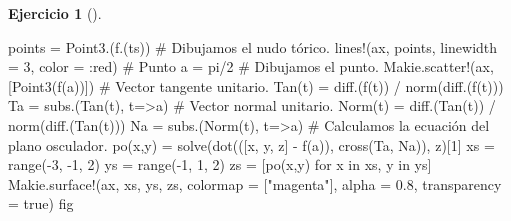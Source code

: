 \documentclass[
  a4paper,
]{scrreport}
\newenvironment{Shaded}{\begin{snugshade}}{\end{snugshade}}
\newcommand{\CommentTok}[1]{\textcolor[rgb]{0.37,0.37,0.37}{#1}}
\newcommand{\ConstantTok}[1]{\textcolor[rgb]{0.56,0.35,0.01}{#1}}
\newcommand{\FloatTok}[1]{\textcolor[rgb]{0.68,0.00,0.00}{#1}}
\newcommand{\FunctionTok}[1]{\textcolor[rgb]{0.28,0.35,0.67}{#1}}
\newcommand{\KeywordTok}[1]{\textcolor[rgb]{0.00,0.23,0.31}{#1}}
\newcommand{\NormalTok}[1]{\textcolor[rgb]{0.00,0.23,0.31}{#1}}
\newcommand{\OperatorTok}[1]{\textcolor[rgb]{0.37,0.37,0.37}{#1}}
\newcommand{\StringTok}[1]{\textcolor[rgb]{0.13,0.47,0.30}{#1}}
\theoremstyle{definition}
\newtheorem{exercise}{Ejercicio}[chapter]
\theoremstyle{remark}
\begin{document}
\begin{exercise}[]
\begin{tcolorbox}
\begin{Shaded}
\begin{Highlighting}[]
\NormalTok{points }\OperatorTok{=} \FunctionTok{Point3}\NormalTok{.(}\FunctionTok{f}\NormalTok{.(ts))}
\CommentTok{\# Dibujamos el nudo tórico.}
\FunctionTok{lines!}\NormalTok{(ax, points, linewidth }\OperatorTok{=} \FloatTok{3}\NormalTok{, color }\OperatorTok{=} \OperatorTok{:}\NormalTok{red)}
\CommentTok{\# Punto}
\NormalTok{a }\OperatorTok{=} \ConstantTok{pi}\OperatorTok{/}\FloatTok{2}
\CommentTok{\# Dibujamos el punto.}
\NormalTok{Makie.}\FunctionTok{scatter!}\NormalTok{(ax, [}\FunctionTok{Point3}\NormalTok{(}\FunctionTok{f}\NormalTok{(a))])}
\CommentTok{\# Vector tangente unitario.}
\FunctionTok{Tan}\NormalTok{(t) }\OperatorTok{=} \FunctionTok{diff}\NormalTok{.(}\FunctionTok{f}\NormalTok{(t)) }\OperatorTok{/} \FunctionTok{norm}\NormalTok{(}\FunctionTok{diff}\NormalTok{.(}\FunctionTok{f}\NormalTok{(t)))}
\NormalTok{Ta }\OperatorTok{=} \FunctionTok{subs}\NormalTok{.(}\FunctionTok{Tan}\NormalTok{(t), t}\OperatorTok{=\textgreater{}}\NormalTok{a)}
\CommentTok{\# Vector normal unitario.}
\FunctionTok{Norm}\NormalTok{(t) }\OperatorTok{=} \FunctionTok{diff}\NormalTok{.(}\FunctionTok{Tan}\NormalTok{(t)) }\OperatorTok{/} \FunctionTok{norm}\NormalTok{(}\FunctionTok{diff}\NormalTok{.(}\FunctionTok{Tan}\NormalTok{(t)))}
\NormalTok{Na }\OperatorTok{=} \FunctionTok{subs}\NormalTok{.(}\FunctionTok{Norm}\NormalTok{(t), t}\OperatorTok{=\textgreater{}}\NormalTok{a)}
\CommentTok{\# Calculamos la ecuación del plano osculador.}
\FunctionTok{po}\NormalTok{(x,y) }\OperatorTok{=} \FunctionTok{solve}\NormalTok{(}\FunctionTok{dot}\NormalTok{(([x, y, z] }\OperatorTok{{-}} \FunctionTok{f}\NormalTok{(a)), }\FunctionTok{cross}\NormalTok{(Ta, Na)), z)[}\FloatTok{1}\NormalTok{]}
\NormalTok{xs }\OperatorTok{=} \FunctionTok{range}\NormalTok{(}\OperatorTok{{-}}\FloatTok{3}\NormalTok{, }\OperatorTok{{-}}\FloatTok{1}\NormalTok{, }\FloatTok{2}\NormalTok{)}
\NormalTok{ys }\OperatorTok{=} \FunctionTok{range}\NormalTok{(}\OperatorTok{{-}}\FloatTok{1}\NormalTok{, }\FloatTok{1}\NormalTok{, }\FloatTok{2}\NormalTok{)}
\NormalTok{zs }\OperatorTok{=}\NormalTok{ [}\FunctionTok{po}\NormalTok{(x,y) for x }\KeywordTok{in}\NormalTok{ xs, y }\KeywordTok{in}\NormalTok{ ys]}
\NormalTok{Makie.}\FunctionTok{surface!}\NormalTok{(ax, xs, ys, zs, colormap }\OperatorTok{=}\NormalTok{ [}\StringTok{"magenta"}\NormalTok{], alpha }\OperatorTok{=} \FloatTok{0.8}\NormalTok{, transparency }\OperatorTok{=} \ConstantTok{true}\NormalTok{)}
\NormalTok{fig}
\end{Highlighting}
\end{Shaded}

\begin{figure}[H]


\end{figure}
\end{tcolorbox}
\end{exercise}
\end{document}
